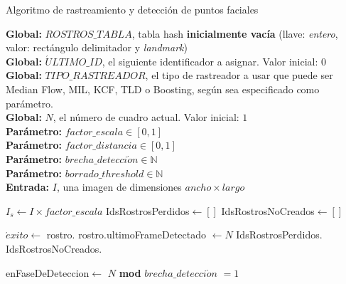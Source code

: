 \documentclass[a4paper,openright,12pt]{report}
\renewcommand{\algorithmicrequire}{\textbf{Entrada: }}
\begin{document}
\begin{algorithm}
  \caption{Algoritmo de rastreamiento y detección de puntos faciales}
  \textbf{Global: }$ROSTROS\_TABLA$, tabla hash \textbf{inicialmente vacía}
      (llave: \textit{entero}, valor: rectángulo delimitador y \textit{landmark})\\
  \textbf{Global: }$\acute{U}LTIMO\_ID$, el siguiente identificador a asignar. Valor inicial: $0$\\
  \textbf{Global: }$TIPO\_RASTREADOR$, el tipo de rastreador a usar que puede
                                       ser Median Flow, MIL, KCF, TLD o
                                       Boosting, según sea especificado como
                                        parámetro.\\
  \textbf{Global: }$N$, el número de cuadro actual. Valor inicial: $1$\\
  \textbf{Parámetro: }$factor\_escala \in [0, 1]$\\
  \textbf{Parámetro: }$factor\_distancia \in [0, 1]$\\
  \textbf{Parámetro: }$brecha\_detecci\acute on \in \mathbb{N}$\\
  \textbf{Parámetro: }$borrado\_threshold \in \mathbb{N}$\\
  \algorithmicrequire{$I$, una imagen de dimensiones $ancho \times largo$}\\
  \begin{algorithmic}[1]

      \State $I_{s}\leftarrow I \times factor\_escala$ 
      \State IdsRostrosPerdidos$\leftarrow []$ 
      \State IdsRostrosNoCreados$\gets []$ 

      \State {}
        \State $\acute{e}xito \gets$ rostro.
          \State rostro.ultimoFrameDetectado $\gets N$
        \Else
          \State IdsRostrosPerdidos.
        \EndIf
          \State IdsRostrosNoCreados.
      \EndFor

      \State enFaseDeDeteccion$\gets$ $N$ \textbf{mod} $brecha\_detecci\acute on$ $= 1$


\end{algorithmic}
\end{algorithm}
\end{document}
